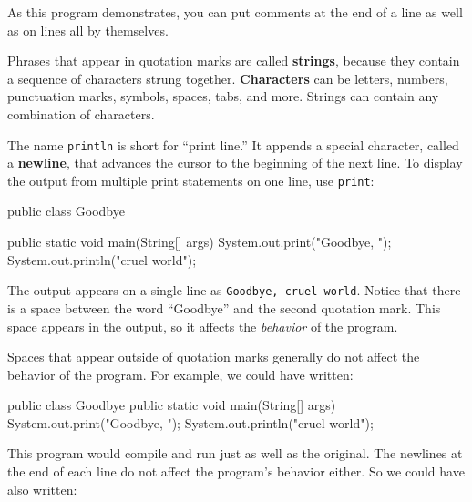 \documentclass[12pt]{book}
\makeatletter
\theoremstyle{exercise}
\newcommand{\java}[1]{\verb"#1"}
\renewcommand\subsection{\@startsection{subsection}{2}{\z@}%
    {-3.25ex\@plus -1ex \@minus -.2ex}%
    {0.3ex \@plus .2ex}%
    {\normalfont\large\bfseries}}
\newcommand{\java}[1]{\lstinline{#1}} %
\makeatother
\begin{document}
As this program demonstrates, you can put comments at the end of a line as well as on lines all by themselves.


Phrases that appear in quotation marks are called {\bf strings}, because they contain a sequence of characters strung together.
{\bf Characters} can be letters, numbers, punctuation marks, symbols, spaces, tabs, and more.
Strings can contain any combination of characters.


The name \java{println} is short for ``print line.''
It appends a special character, called a {\bf newline}, that advances the cursor to the beginning of the next line.
To display the output from multiple print statements on one line, use \java{print}:

\begin{code}
public class Goodbye {

    public static void main(String[] args) {
        System.out.print("Goodbye, ");
        System.out.println("cruel world");
    }

}
\end{code}

The output appears on a single line as {\tt Goodbye, cruel world}.
Notice that there is a space between the word ``Goodbye'' and the second quotation mark.
This space appears in the output, so it affects the {\em behavior} of the program.

\label{sec:formatting}

Spaces that appear outside of quotation marks generally do not affect the behavior of the program.
For example, we could have written:

\begin{code}
public class Goodbye {
public static void main(String[] args) {
System.out.print("Goodbye, ");
System.out.println("cruel world");
}
}
\end{code}

This program would compile and run just as well as the original.
The newlines at the end of each line do not affect the program's behavior either.
So we could have also written:
\end{document}
